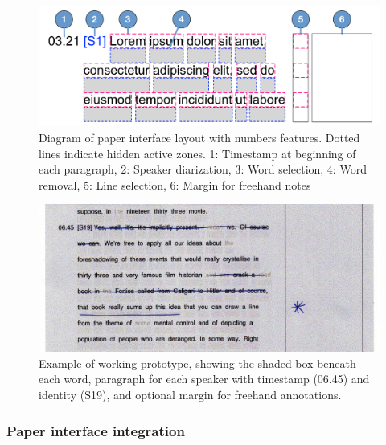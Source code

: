 \begin{figure}[h]
  \centering
  \includegraphics[width=\columnwidth]{figs/paper-interface-diagram.pdf}
  \caption{Diagram of paper interface layout with numbers features. Dotted lines indicate hidden active zones. 1:
    Timestamp at beginning of each paragraph, 2: Speaker diarization, 3: Word selection, 4: Word removal, 5: Line
    selection, 6: Margin for freehand notes}
  \label{fig:paper-interface-diagram}
\end{figure}

\begin{figure}[h]
  \centering
  \includegraphics[width=\columnwidth]{figs/interface-darkened}
  \caption{Example of working prototype, showing the shaded box beneath each
    word, paragraph for each speaker with timestamp (06.45) and identity (S19),
    and optional margin for freehand annotations.}
  \label{fig:layout}
\end{figure}

\subsubsection{Paper interface integration}

